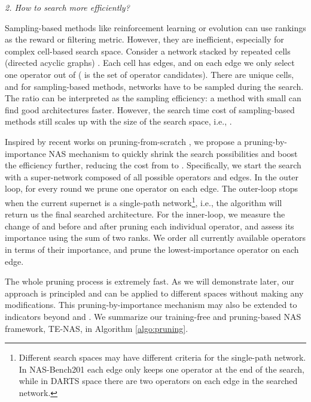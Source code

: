 \documentclass{article} \usepackage{iclr2021_conference,times}
\begin{document}
\vspace{-0.5em}
\textit{2. How to search more efficiently?}

Sampling-based methods like reinforcement learning or evolution can use rankings as the reward or filtering metric. However, they are inefficient, especially for complex cell-based search space. Consider a network stacked by repeated cells (directed acyclic graphs) \citep{zoph2018learning,liu2018darts}. Each cell has  edges, and on each edge we only select one operator out of  ( is the set of operator candidates). There are  unique cells, and for sampling-based methods,  networks have to be sampled during the search. The ratio  can be interpreted as the sampling efficiency: a method with small  can find good architectures faster. However, the search time cost of sampling-based methods still scales up with the size of the search space, i.e., .

Inspired by recent works on pruning-from-scratch \citep{lee2018snip,wang2020picking}, 
we propose a pruning-by-importance NAS mechanism to quickly shrink the search possibilities and boost the efficiency further, reducing the cost from  to .
Specifically, we start the search with a super-network  composed of all possible operators and edges. In the outer loop, for every round we prune one operator on each edge. The outer-loop stops when the current supernet  is a single-path network\footnote{Different search spaces may have different criteria for the single-path network. In NAS-Bench201 \citep{dong2020bench} each edge only keeps one operator at the end of the search, while in DARTS space \citep{liu2018darts} there are two operators on each edge in the searched network.}, i.e., the algorithm will return us the final searched architecture. For the inner-loop, we measure the change of  and  before and after pruning each individual operator, and assess its importance using the sum of two ranks. We order all currently available operators in terms of their importance, and prune the lowest-importance operator on each edge.


The whole pruning process is extremely fast. As we will demonstrate later, our approach is principled and can be applied to different spaces without making any modifications.
This pruning-by-importance mechanism may also be extended to indicators beyond   and .
We summarize our training-free and pruning-based NAS framework, TE-NAS, in Algorithm \ref{algo:pruning}. 
\end{document}
